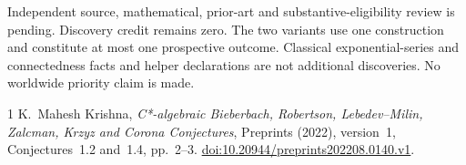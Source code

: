 \documentclass[11pt]{article}
\begin{document}
Independent source, mathematical, prior-art and substantive-eligibility
review is pending. Discovery credit remains zero. The two variants use one
construction and constitute at most one prospective outcome. Classical
exponential-series and connectedness facts and helper declarations are not
additional discoveries. No worldwide priority claim is made.

\begin{thebibliography}{1}
 K.~Mahesh Krishna,
\emph{C*-algebraic Bieberbach, Robertson, Lebedev--Milin, Zalcman, Krzyz and
Corona Conjectures}, Preprints (2022), version~1,
Conjectures~1.2 and~1.4, pp.~2--3.
\href{https://doi.org/10.20944/preprints202208.0140.v1}{doi:10.20944/preprints202208.0140.v1}.
\end{thebibliography}
\end{document}
